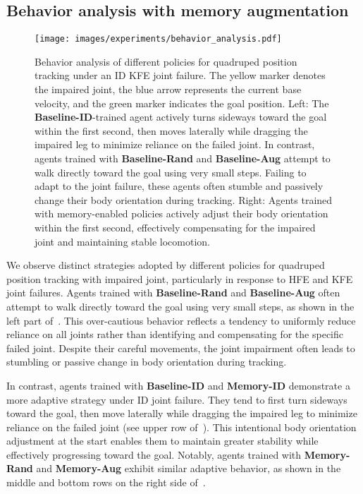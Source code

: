 \subsection{Behavior analysis with memory augmentation}

\begin{figure*}
\centering
\texttt{[image: images/experiments/behavior\_analysis.pdf]}
\caption{Behavior analysis of different policies for quadruped position tracking under an ID KFE joint failure.
The yellow marker denotes the impaired joint, the blue arrow represents the current base velocity, and the green marker indicates the goal position.
Left: The \textbf{Baseline-ID}-trained agent actively turns sideways toward the goal within the first second, then moves laterally while dragging the impaired leg to minimize reliance on the failed joint. 
In contrast, agents trained with \textbf{Baseline-Rand} and \textbf{Baseline-Aug} attempt to walk directly toward the goal using very small steps. 
Failing to adapt to the joint failure, these agents often stumble and passively change their body orientation during tracking. 
Right: Agents trained with memory-enabled policies actively adjust their body orientation within the first second, effectively compensating for the impaired joint and maintaining stable locomotion.}
\label{fig:behavior_analysis}
\end{figure*}

We observe distinct strategies adopted by different policies for quadruped position tracking with impaired joint, particularly in response to HFE and KFE joint failures.
Agents trained with \textbf{Baseline-Rand} and \textbf{Baseline-Aug} often attempt to walk directly toward the goal using very small steps, as shown in the left part of~.
This over-cautious behavior reflects a tendency to uniformly reduce reliance on all joints rather than identifying and compensating for the specific failed joint. 
Despite their careful movements, the joint impairment often leads to stumbling or passive change in body orientation during tracking.

In contrast, agents trained with \textbf{Baseline-ID} and \textbf{Memory-ID} demonstrate a more adaptive strategy under ID joint failure.
They tend to first turn sideways toward the goal, then move laterally while dragging the impaired leg to minimize reliance on the failed joint (see upper row of~).
This intentional body orientation adjustment at the start enables them to maintain greater stability while effectively progressing toward the goal.
Notably, agents trained with \textbf{Memory-Rand} and \textbf{Memory-Aug} exhibit similar adaptive behavior, as shown in the middle and bottom rows on the right side of~.

